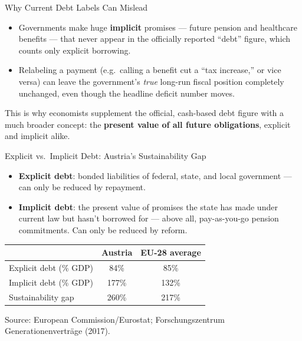 \documentclass[11pt,aspectratio=169]{beamer}
\newcommand{\srcnote}[1]{{\footnotesize\color{wugray}Source: #1}}
\begin{document}
\begin{frame}{Why Current Debt Labels Can Mislead}
  
  \begin{itemize}
    \item Governments make huge \textbf{implicit} promises --- future pension and healthcare benefits --- that never appear in the officially reported ``debt'' figure, which counts only explicit borrowing.
    \item Relabeling a payment (e.g.\ calling a benefit cut a ``tax increase,'' or vice versa) can leave the government's \emph{true} long-run fiscal position completely unchanged, even though the headline deficit number moves.
  \end{itemize}
  \vspace{0.3em}
 
  This is why economists supplement the official, cash-based debt figure with a much broader concept: the \textbf{present value of all future obligations}, explicit and implicit alike.\\
 
\end{frame}

\begin{frame}{Explicit vs.\ Implicit Debt: Austria's Sustainability Gap}
  \small
  \begin{itemize}
    \item \textbf{Explicit debt}: bonded liabilities of federal, state, and local government --- can only be reduced by repayment.
    \item \textbf{Implicit debt}: the present value of promises the state has made under current law but hasn't borrowed for --- above all, pay-as-you-go pension commitments. Can only be reduced by reform.
  \end{itemize}
  \vspace{0.3em}
  \begin{center}
  \begin{tabular}{@{}lcc@{}}
    \toprule
     & \textbf{Austria} & \textbf{EU-28 average} \\
    \midrule
    Explicit debt (\% GDP) & 84\% & 85\% \\
    Implicit debt (\% GDP) & 177\% & 132\% \\
    Sustainability gap & 260\% & 217\% \\
    \bottomrule
  \end{tabular}
  \end{center}
  \srcnote{European Commission/Eurostat; Forschungszentrum Generationenverträge (2017).}
\end{frame}
\end{document}
